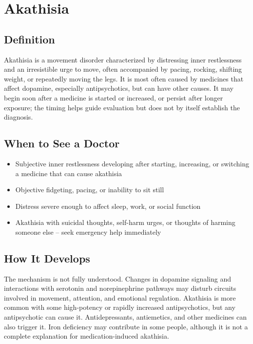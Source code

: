 \chapter{Akathisia}

\section*{Definition}
Akathisia is a movement disorder characterized by distressing inner restlessness and an irresistible urge to move, often accompanied by pacing, rocking, shifting weight, or repeatedly moving the legs. It is most often caused by medicines that affect dopamine, especially antipsychotics, but can have other causes. It may begin soon after a medicine is started or increased, or persist after longer exposure; the timing helps guide evaluation but does not by itself establish the diagnosis.

\section*{When to See a Doctor}

\begin{itemize}
 \item Subjective inner restlessness developing after starting, increasing, or switching a medicine that can cause akathisia
 \item Objective fidgeting, pacing, or inability to sit still
 \item Distress severe enough to affect sleep, work, or social function
 \item Akathisia with suicidal thoughts, self-harm urges, or thoughts of harming someone else -- seek emergency help immediately
\end{itemize}

\section*{How It Develops}
The mechanism is not fully understood. Changes in dopamine signaling and interactions with serotonin and norepinephrine pathways may disturb circuits involved in movement, attention, and emotional regulation. Akathisia is more common with some high-potency or rapidly increased antipsychotics, but any antipsychotic can cause it. Antidepressants, antiemetics, and other medicines can also trigger it. Iron deficiency may contribute in some people, although it is not a complete explanation for medication-induced akathisia.

